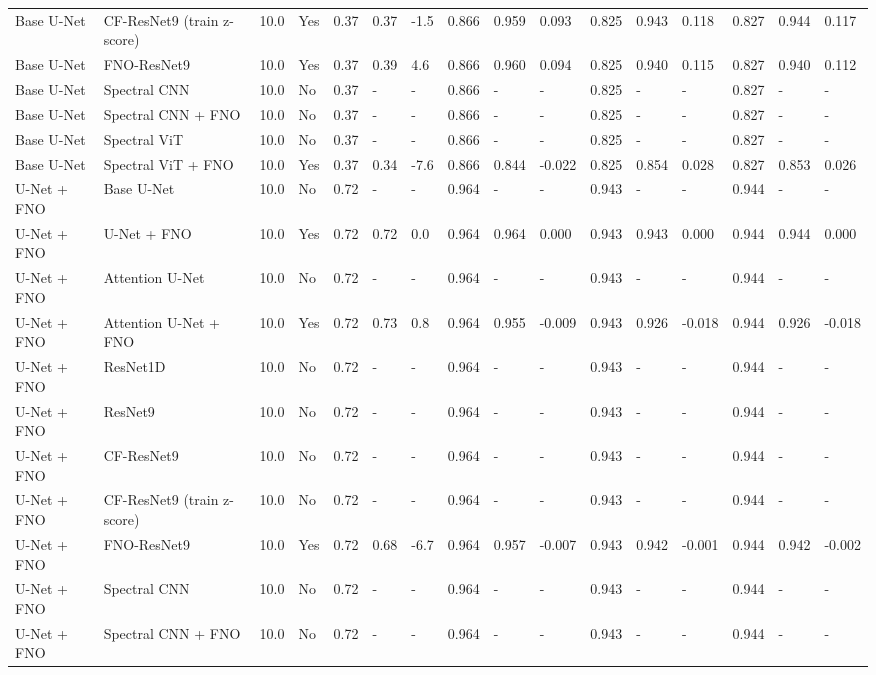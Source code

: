 \begin{longtable}{llllllllllllllll}
Base U-Net & CF-ResNet9 (train z-score) & 10.0 & Yes & 0.37 & 0.37 & -1.5 & 0.866 & 0.959 & 0.093 & 0.825 & 0.943 & 0.118 & 0.827 & 0.944 & 0.117 \\
Base U-Net & FNO-ResNet9 & 10.0 & Yes & 0.37 & 0.39 & 4.6 & 0.866 & 0.960 & 0.094 & 0.825 & 0.940 & 0.115 & 0.827 & 0.940 & 0.112 \\
Base U-Net & Spectral CNN & 10.0 & No & 0.37 & - & - & 0.866 & - & - & 0.825 & - & - & 0.827 & - & - \\
Base U-Net & Spectral CNN + FNO & 10.0 & No & 0.37 & - & - & 0.866 & - & - & 0.825 & - & - & 0.827 & - & - \\
Base U-Net & Spectral ViT & 10.0 & No & 0.37 & - & - & 0.866 & - & - & 0.825 & - & - & 0.827 & - & - \\
Base U-Net & Spectral ViT + FNO & 10.0 & Yes & 0.37 & 0.34 & -7.6 & 0.866 & 0.844 & -0.022 & 0.825 & 0.854 & 0.028 & 0.827 & 0.853 & 0.026 \\
U-Net + FNO & Base U-Net & 10.0 & No & 0.72 & - & - & 0.964 & - & - & 0.943 & - & - & 0.944 & - & - \\
U-Net + FNO & U-Net + FNO & 10.0 & Yes & 0.72 & 0.72 & 0.0 & 0.964 & 0.964 & 0.000 & 0.943 & 0.943 & 0.000 & 0.944 & 0.944 & 0.000 \\
U-Net + FNO & Attention U-Net & 10.0 & No & 0.72 & - & - & 0.964 & - & - & 0.943 & - & - & 0.944 & - & - \\
U-Net + FNO & Attention U-Net + FNO & 10.0 & Yes & 0.72 & 0.73 & 0.8 & 0.964 & 0.955 & -0.009 & 0.943 & 0.926 & -0.018 & 0.944 & 0.926 & -0.018 \\
U-Net + FNO & ResNet1D & 10.0 & No & 0.72 & - & - & 0.964 & - & - & 0.943 & - & - & 0.944 & - & - \\
U-Net + FNO & ResNet9 & 10.0 & No & 0.72 & - & - & 0.964 & - & - & 0.943 & - & - & 0.944 & - & - \\
U-Net + FNO & CF-ResNet9 & 10.0 & No & 0.72 & - & - & 0.964 & - & - & 0.943 & - & - & 0.944 & - & - \\
U-Net + FNO & CF-ResNet9 (train z-score) & 10.0 & No & 0.72 & - & - & 0.964 & - & - & 0.943 & - & - & 0.944 & - & - \\
U-Net + FNO & FNO-ResNet9 & 10.0 & Yes & 0.72 & 0.68 & -6.7 & 0.964 & 0.957 & -0.007 & 0.943 & 0.942 & -0.001 & 0.944 & 0.942 & -0.002 \\
U-Net + FNO & Spectral CNN & 10.0 & No & 0.72 & - & - & 0.964 & - & - & 0.943 & - & - & 0.944 & - & - \\
U-Net + FNO & Spectral CNN + FNO & 10.0 & No & 0.72 & - & - & 0.964 & - & - & 0.943 & - & - & 0.944 & - & - \\

\end{longtable}
